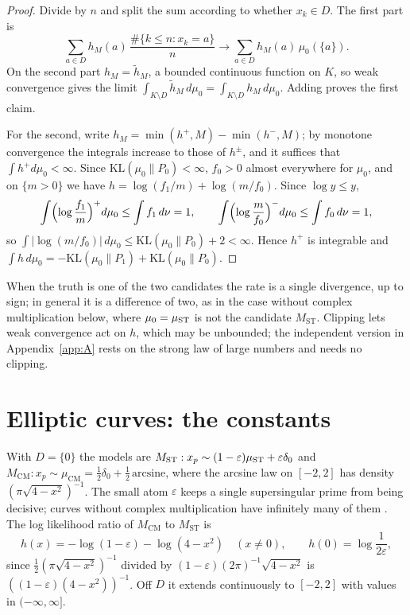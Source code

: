 \begin{proof}
Divide by $n$ and split the sum according to whether $x_k\in D$. The first part is
\[
\sum_{a\in D}h_M(a)\,\frac{\#\{k\le n:x_k=a\}}n\longrightarrow\sum_{a\in D}h_M(a)\,\mu_0(\{a\}).
\]
On the second part $h_M=\tilde h_M$, a bounded continuous function on $K$, so weak convergence gives the limit $\int_{K\setminus D}\tilde h_M\,d\mu_0=\int_{K\setminus D}h_M\,d\mu_0$. Adding proves the first claim.

For the second, write $h_M=\min(h^+,M)-\min(h^-,M)$; by monotone convergence the integrals increase to those of $h^\pm$, and it suffices that $\int h^+d\mu_0<\infty$. Since $\mathrm{KL}(\mu_0\|P_0)<\infty$, $f_0>0$ almost everywhere for $\mu_0$, and on $\{m>0\}$ we have $h=\log(f_1/m)+\log(m/f_0)$. Since $\log y\le y$,
\[
\int\Bigl(\log\frac{f_1}{m}\Bigr)^+d\mu_0\le\int f_1\,d\nu=1,\qquad\int\Bigl(\log\frac{m}{f_0}\Bigr)^-d\mu_0\le\int f_0\,d\nu=1,
\]
so $\int|\log(m/f_0)|\,d\mu_0\le\mathrm{KL}(\mu_0\|P_0)+2<\infty$. Hence $h^+$ is integrable and $\int h\,d\mu_0=-\mathrm{KL}(\mu_0\|P_1)+\mathrm{KL}(\mu_0\|P_0)$.
\end{proof}

When the truth is one of the two candidates the rate is a single divergence, up to sign; in general it is a difference of two, as in the case without complex multiplication below, where $\mu_0=\mu_{\mathrm{ST}}$ is not the candidate $M_{\mathrm{ST}}$. Clipping lets weak convergence act on $h$, which may be unbounded; the independent version in Appendix~\ref{app:A} rests on the strong law of large numbers and needs no clipping.

\section{Elliptic curves: the constants}

With $D=\{0\}$ the models are $M_{\mathrm{ST}}:x_p\sim(1-\varepsilon)\mu_{\mathrm{ST}}+\varepsilon\delta_0$ and $M_{\mathrm{CM}}:x_p\sim\mu_{\mathrm{CM}}=\frac12\delta_0+\frac12\,\mathrm{arcsine}$, where the arcsine law on $[-2,2]$ has density $(\pi\sqrt{4-x^2})^{-1}$. The small atom $\varepsilon$ keeps a single supersingular prime from being decisive; curves without complex multiplication have infinitely many of them \cite{elkies1987}. The log likelihood ratio of $M_{\mathrm{CM}}$ to $M_{\mathrm{ST}}$ is
\[
h(x)=-\log(1-\varepsilon)-\log(4-x^2)\quad(x\neq0),\qquad h(0)=\log\frac1{2\varepsilon},
\]
since $\frac12(\pi\sqrt{4-x^2})^{-1}$ divided by $(1-\varepsilon)(2\pi)^{-1}\sqrt{4-x^2}$ is $((1-\varepsilon)(4-x^2))^{-1}$. Off $D$ it extends continuously to $[-2,2]$ with values in $(-\infty,\infty]$.

